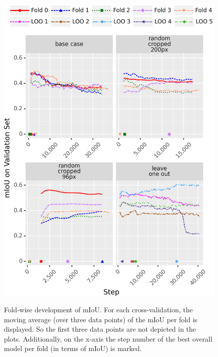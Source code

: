 \begin{figure}[p]
    \centering  %
    \includegraphics[width=\textwidth]{pictures/experiment_2/mIoU_base-case_final_base-case_loo_random_cropped_final_random_cropped_res96_final}\\
    \caption[Fold-wise Development of mIoU]{Fold-wise development of mIoU. For each cross-validation, the moving average (over three data points) of the mIoU per fold is displayed. So the first three data points are not depicted in the plots. Additionally, on the x-axis the step number of the best overall model per fold (in terms of mIoU) is marked.\\}  %
    \label{fig:miou-per-fold}
\end{figure}


